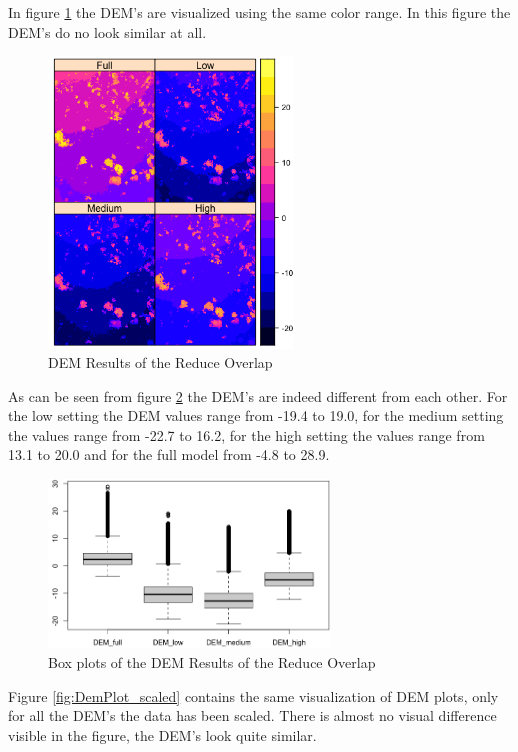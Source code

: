 \documentclass{isprs} %
\begin{document}
In figure \ref{fig:DemPlot_unscaled} the DEM's are visualized using the same color range. 
In this figure the DEM's do no look similar at all.

\begin{figure}[h!]
    \centering
    \includegraphics[width=6.5cm]{DEM2x2.png}
    \caption{DEM Results of the Reduce Overlap}
    \label{fig:DemPlot_unscaled}
\end{figure}

As can be seen from figure \ref{fig:BoxPlot_unscaled} the DEM's are indeed different from each other. 
For the low setting the DEM values range from -19.4 to 19.0, for the medium setting the values range from -22.7 to 16.2, for the high setting the values range from 13.1 to 20.0 and for the full model from -4.8 to 28.9.

\begin{figure}[h!]
    \centering
    \includegraphics[width=7.5cm]{DemBoxplot.png}
    \caption{Box plots of the DEM Results of the Reduce Overlap}
    \label{fig:BoxPlot_unscaled}
\end{figure}

Figure \ref{fig:DemPlot_scaled} contains the same visualization of DEM plots, only for all the DEM's the data has been scaled.
There is almost no visual difference visible in the figure, the DEM's look quite similar.
\end{document}

